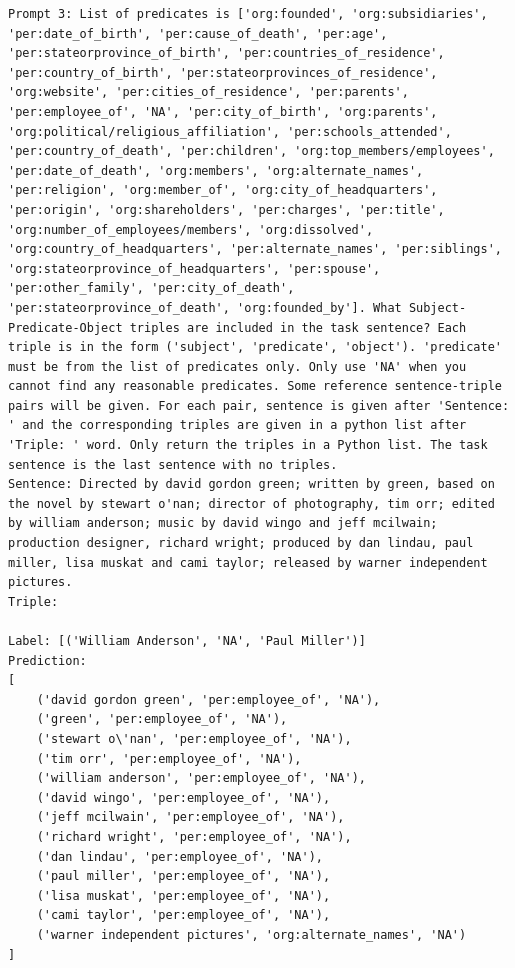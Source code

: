 \documentclass{article}
\begin{document}
\begin{lstlisting}
Prompt 3: List of predicates is ['org:founded', 'org:subsidiaries', 'per:date_of_birth', 'per:cause_of_death', 'per:age', 'per:stateorprovince_of_birth', 'per:countries_of_residence', 'per:country_of_birth', 'per:stateorprovinces_of_residence', 'org:website', 'per:cities_of_residence', 'per:parents', 'per:employee_of', 'NA', 'per:city_of_birth', 'org:parents', 'org:political/religious_affiliation', 'per:schools_attended', 'per:country_of_death', 'per:children', 'org:top_members/employees', 'per:date_of_death', 'org:members', 'org:alternate_names', 'per:religion', 'org:member_of', 'org:city_of_headquarters', 'per:origin', 'org:shareholders', 'per:charges', 'per:title', 'org:number_of_employees/members', 'org:dissolved', 'org:country_of_headquarters', 'per:alternate_names', 'per:siblings', 'org:stateorprovince_of_headquarters', 'per:spouse', 'per:other_family', 'per:city_of_death', 'per:stateorprovince_of_death', 'org:founded_by']. What Subject-Predicate-Object triples are included in the task sentence? Each triple is in the form ('subject', 'predicate', 'object'). 'predicate' must be from the list of predicates only. Only use 'NA' when you cannot find any reasonable predicates. Some reference sentence-triple pairs will be given. For each pair, sentence is given after 'Sentence: ' and the corresponding triples are given in a python list after 'Triple: ' word. Only return the triples in a Python list. The task sentence is the last sentence with no triples.
Sentence: Directed by david gordon green; written by green, based on the novel by stewart o'nan; director of photography, tim orr; edited by william anderson; music by david wingo and jeff mcilwain; production designer, richard wright; produced by dan lindau, paul miller, lisa muskat and cami taylor; released by warner independent pictures. 
Triple:

Label: [('William Anderson', 'NA', 'Paul Miller')]
Prediction: 
[
    ('david gordon green', 'per:employee_of', 'NA'),
    ('green', 'per:employee_of', 'NA'),
    ('stewart o\'nan', 'per:employee_of', 'NA'),
    ('tim orr', 'per:employee_of', 'NA'),
    ('william anderson', 'per:employee_of', 'NA'),
    ('david wingo', 'per:employee_of', 'NA'),
    ('jeff mcilwain', 'per:employee_of', 'NA'),
    ('richard wright', 'per:employee_of', 'NA'),
    ('dan lindau', 'per:employee_of', 'NA'),
    ('paul miller', 'per:employee_of', 'NA'),
    ('lisa muskat', 'per:employee_of', 'NA'),
    ('cami taylor', 'per:employee_of', 'NA'),
    ('warner independent pictures', 'org:alternate_names', 'NA')
]
\end{lstlisting}
\end{document}
